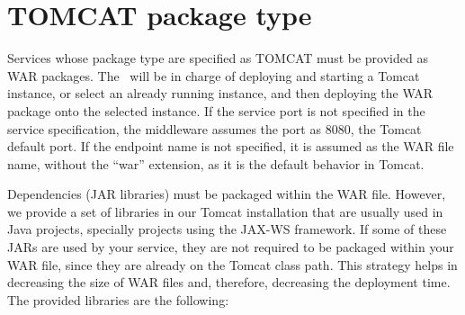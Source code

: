 \section{TOMCAT package type}

Services whose package type are specified as TOMCAT must be provided as WAR packages. The \ee\ will be in charge of deploying and starting a Tomcat instance, or select an already running instance, and then deploying the WAR package onto the selected instance. If the service port is not specified in the service specification, the middleware assumes the port as 8080, the Tomcat default port. If the endpoint name is not specified, it is assumed as the WAR file name, without the ``war'' extension, as it is the default behavior in Tomcat.  

Dependencies (JAR libraries) must be packaged within the WAR file. However, we provide a set of libraries in our Tomcat installation that are usually used in Java projects, specially projects using the JAX-WS framework. If some of these JARs are used by your service, they are not required to be packaged within your WAR file, since they are already on the Tomcat class path. This strategy helps in decreasing the size of WAR files and, therefore, decreasing the deployment time. The provided libraries are the following:

